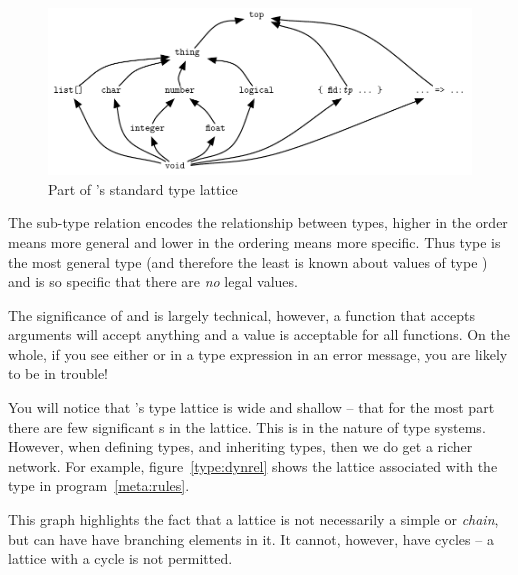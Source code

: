 \begin{figure}
\centerline{\includegraphics[width=\textwidth]{lattice}}
\caption{\label{type:lattice}Part of \go's standard type lattice}
\end{figure}

The sub-type relation encodes the relationship between types, higher in the order means more general and lower in the ordering means more specific. Thus  type is the most general type (and therefore the least is known about values of type ) and  is so specific that there are \emph{no} legal  values.

The significance of  and  is largely technical, however, a function that accepts  arguments will accept anything and a  value is acceptable for all functions. On the whole, if you see either  or  in a type expression in an error message, you are likely to be in trouble!

You will notice that \go's type lattice is wide and shallow -- that for the most part there are few significant s in the lattice. This is in the nature of type systems. However, when defining types, and inheriting types, then we do get a richer network. For example, figure~\vref{type:dynrel} shows the lattice associated with the  type in program~\vref{meta:rules}.

This graph highlights the fact that a lattice is not necessarily a simple  or \emph{chain}, but can have have branching elements in it. It cannot, however, have cycles -- a lattice with a cycle is not permitted.

